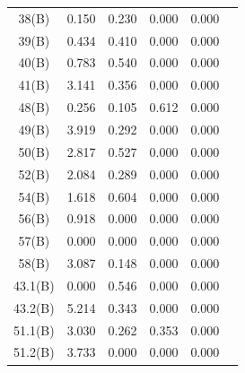 \documentclass{my_paper}
\begin{document}
\begin{enumerate}
\begin{longtable}{c|ccccc}
38(B)   & 0.150  & 0.230 & 0.000  & 0.000  &        \\
39(B)   & 0.434  & 0.410 & 0.000  & 0.000  &        \\
40(B)   & 0.783  & 0.540 & 0.000  & 0.000  &        \\
41(B)   & 3.141  & 0.356 & 0.000  & 0.000  &        \\
48(B)   & 0.256  & 0.105 & 0.612  & 0.000  &        \\
49(B)   & 3.919  & 0.292 & 0.000  & 0.000  &        \\
50(B)   & 2.817  & 0.527 & 0.000  & 0.000  &        \\
52(B)   & 2.084  & 0.289 & 0.000  & 0.000  &        \\
54(B)   & 1.618  & 0.604 & 0.000  & 0.000  &        \\
56(B)   & 0.918  & 0.000 & 0.000  & 0.000  &        \\
57(B)   & 0.000  & 0.000 & 0.000  & 0.000  &        \\
58(B)   & 3.087  & 0.148 & 0.000  & 0.000  &        \\
43.1(B) & 0.000  & 0.546 & 0.000  & 0.000  &        \\
43.2(B) & 5.214  & 0.343 & 0.000  & 0.000  &        \\
51.1(B) & 3.030  & 0.262 & 0.353  & 0.000  &        \\
51.2(B) & 3.733  & 0.000 & 0.000  & 0.000  &       \\\bottomrule
  \end{longtable}
\end{enumerate}




% 
\end{document}
